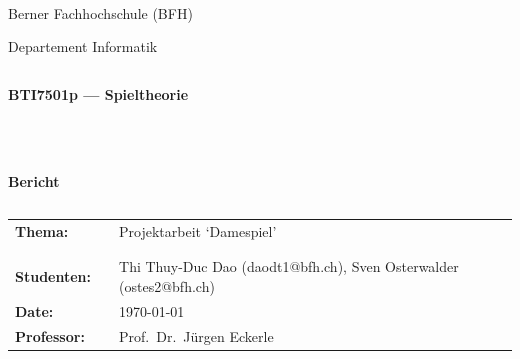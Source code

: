 \thispagestyle{empty}
\begin{center}
\\
\end{center}
\begin{center}
\Large{Berner Fachhochschule (BFH)}\\
\end{center}
 
 
\begin{center}
\Large{Departement Informatik}
\end{center}
\begin{verbatim}
\end{verbatim}
\begin{center}
\textbf{\LARGE{BTI7501p --- Spieltheorie}}
\end{center}
\begin{verbatim}
 
 
\end{verbatim}
\begin{center}
\textbf{Bericht}
\end{center}
\begin{verbatim} 
\end{verbatim}
 
\begin{flushleft}
\begin{tabular}{lll}
\textbf{Thema:} & & Projektarbeit `Damespiel'\\
& & \\
& & \\
    \textbf{Studenten:} & & Thi Thuy-Duc Dao (daodt1@bfh.ch), Sven Osterwalder (ostes2@bfh.ch)\\
\textbf{Date:} & & {\today}\\
\textbf{Professor:} & & Prof.\  Dr.\ Jürgen Eckerle
\end{tabular}
\end{flushleft}
